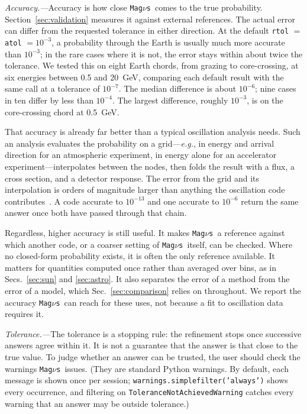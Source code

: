 \documentclass[final,5p,times,twocolumn,sort,compress]{elsarticle}
\makeatletter
\newcommand{\eg}{{\it e.g.}}
\DeclareRobustCommand{\_}{%
  \ifmmode\nfss@text{\textunderscore}\else\textunderscore\allowbreak\fi}
\newcommand{\magnus}{{\tt Mag}\ensuremath{\nu}{\tt s}}
\makeatother
\begin{document}
\smallskip

\textit{Accuracy.---}Accuracy is how close \magnus\ comes to the true probability. Section~\ref{sec:validation} measures it against external references. The actual error can differ from the requested tolerance in either direction. At the default {\tt rtol} $=$ {\tt atol} $= 10^{-3}$, a probability through the Earth is usually much more accurate than $10^{-3}$; in the rare cases where it is not, the error stays within about twice the tolerance. We tested this on eight Earth chords, from grazing to core-crossing, at six energies between 0.5 and 20~GeV, comparing each default result with the same call at a tolerance of $10^{-7}$. The median difference is about $10^{-6}$; nine cases in ten differ by less than $10^{-4}$. The largest difference, roughly $10^{-3}$, is on the core-crossing chord at 0.5~GeV.

That accuracy is already far better than a typical oscillation analysis needs. Such an analysis evaluates the probability on a grid---\eg, in energy and arrival direction for an atmospheric experiment, in energy alone for an accelerator experiment---interpolates between the nodes, then folds the result with a flux, a cross section, and a detector response. The error from the grid and its interpolation is orders of magnitude larger than anything the oscillation code contributes\ \cite{IceCube:2018ikn}. A code accurate to $10^{-13}$ and one accurate to $10^{-6}$ return the same answer once both have passed through that chain.

Regardless, higher accuracy is still useful. It makes \magnus\ a reference against which another code, or a coarser setting of \magnus\ itself, can be checked. Where no closed-form probability exists, it is often the only reference available. It matters for quantities computed once rather than averaged over bins, as in Secs.~\ref{sec:sun} and \ref{sec:astro}. It also separates the error of a method from the error of a model, which Sec.~\ref{sec:comparison} relies on throughout. We report the accuracy \magnus\ can reach for these uses, not because a fit to oscillation data requires it.

\smallskip

\textit{Tolerance.---}The tolerance is a stopping rule: the refinement stops once successive answers agree within it. It is not a guarantee that the answer is that close to the true value. To judge whether an answer can be trusted, the user should check the warnings \magnus\ issues. (They are standard Python warnings. By default, each message is shown once per session; {\tt warnings.simplefilter('always')} shows every occurrence, and filtering on {\tt ToleranceNotAchievedWarning} catches every warning that an answer may be outside tolerance.)
\end{document}
